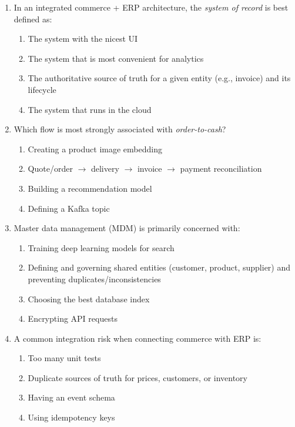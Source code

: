 \begin{enumerate}
  \item In an integrated commerce + ERP architecture, the \emph{system of record} is best defined as:
  \begin{enumerate}
    \item The system with the nicest UI
    \item The system that is most convenient for analytics
    \item The authoritative source of truth for a given entity (e.g., invoice) and its lifecycle
    \item The system that runs in the cloud
  \end{enumerate}

  \item Which flow is most strongly associated with \emph{order-to-cash}?
  \begin{enumerate}
    \item Creating a product image embedding
    \item Quote/order $\rightarrow$ delivery $\rightarrow$ invoice $\rightarrow$ payment reconciliation
    \item Building a recommendation model
    \item Defining a Kafka topic
  \end{enumerate}

  \item Master data management (MDM) is primarily concerned with:
  \begin{enumerate}
    \item Training deep learning models for search
    \item Defining and governing shared entities (customer, product, supplier) and preventing duplicates/inconsistencies
    \item Choosing the best database index
    \item Encrypting API requests
  \end{enumerate}

  \item A common integration risk when connecting commerce with ERP is:
  \begin{enumerate}
    \item Too many unit tests
    \item Duplicate sources of truth for prices, customers, or inventory
    \item Having an event schema
    \item Using idempotency keys
  \end{enumerate}


\end{enumerate}
